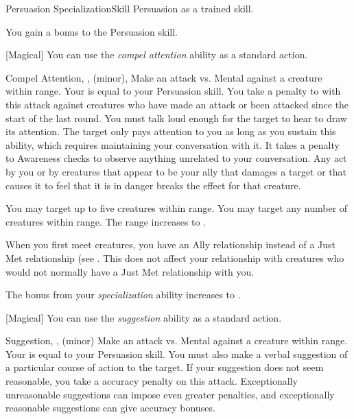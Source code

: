     \begin{feat}{Persuasion Specialization}{Skill}
        \featpre Persuasion as a trained skill.

         You gain a  bonus to the Persuasion skill.

        [Magical] You can use the \textit{compel attention} ability as a standard action.
        \begin{sustainability}{Compel Attention}{, ,  (minor), }
            \rankline
            Make an attack vs. Mental against a creature within \rngmed range.
            Your  is equal to your Persuasion skill.
            You take a  penalty to  with this attack against creatures who have made an attack or been attacked since the start of the last round.
            You must talk loud enough for the target to hear to draw its attention.
            \hit The target only pays attention to you as long as you sustain this ability, which requires maintaining your conversation with it.
            It takes a  penalty to Awareness checks to observe anything unrelated to your conversation.
            Any act by you or by creatures that appear to be your ally that damages a target or that causes it to feel that it is in danger breaks the effect for that creature.

            \rankline
             You may target up to five creatures within range.
             You may target any number of creatures within range.
             The range increases to \distrange.
        \end{sustainability}

         When you first meet creatures, you have an Ally relationship instead of a Just Met relationship (see .
        This does not affect your relationship with creatures who would not normally have a Just Met relationship with you.

         The bonus from your \textit{specialization} ability increases to .

        [Magical] You can use the \textit{suggestion} ability as a standard action.
        \begin{sustainability}{Suggestion}{, ,  (minor)}
            \rankline
            Make an attack vs. Mental against a creature within \rngmed range.
            Your  is equal to your Persuasion skill.
            You must also make a verbal suggestion of a particular course of action to the target.
            If your suggestion does not seem reasonable, you take a  accuracy penalty on this attack.
            Exceptionally unreasonable suggestions can impose even greater penalties, and exceptionally reasonable suggestions can give accuracy bonuses.


\end{sustainability}
\end{feat}

